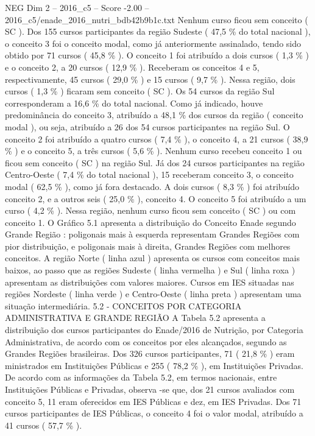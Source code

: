 \begin{textsample}{NEG Dim 2 – 2016\_c5 – Score -2.00 – 2016\_c5/enade\_2016\_nutri\_bdb42b9b1c.txt}
Nenhum curso ficou sem conceito ( SC ).
Dos 155 cursos participantes da região Sudeste ( 47,5 \% do total nacional ), o conceito 3 foi o conceito modal, como já anteriormente assinalado, tendo sido obtido por 71 cursos ( 45,8 \% ).
O conceito 1 foi atribuído a dois cursos ( 1,3 \% ) e o conceito 2, a 20 cursos ( 12,9 \% ).
Receberam os conceitos 4 e 5, respectivamente, 45 cursos ( 29,0 \% ) e 15 cursos ( 9,7 \% ).
Nessa região, dois cursos ( 1,3 \% ) ficaram sem conceito ( SC ).
Os 54 cursos da região Sul corresponderam a 16,6 \% do total nacional.
Como já indicado, houve predominância do conceito 3, atribuído a 48,1 \% dos cursos da região ( conceito modal ), ou seja, atribuído a 26 dos 54 cursos participantes na região Sul.
O conceito 2 foi atribuído a quatro cursos ( 7,4 \% ), o conceito 4, a 21 cursos ( 38,9 \% ) e o conceito 5, a três cursos ( 5,6 \% ).
Nenhum curso recebeu conceito 1 ou ficou sem conceito ( SC ) na região Sul.
Já dos 24 cursos participantes na região Centro-Oeste ( 7,4 \% do total nacional ), 15 receberam conceito 3, o conceito modal ( 62,5 \% ), como já fora destacado.
A dois cursos ( 8,3 \% ) foi atribuído conceito 2, e a outros seis ( 25,0 \% ), conceito 4.
O conceito 5 foi atribuído a um curso ( 4,2 \% ).
Nessa região, nenhum curso ficou sem conceito ( SC ) ou com conceito 1.
O Gráfico 5.1 apresenta a distribuição do Conceito Enade segundo Grande Região : poligonais mais à esquerda representam Grandes Regiões com pior distribuição, e poligonais mais à direita, Grandes Regiões com melhores conceitos.
A região Norte ( linha azul ) apresenta os cursos com conceitos mais baixos, ao passo que as regiões Sudeste ( linha vermelha ) e Sul ( linha roxa ) apresentam as distribuições com valores maiores.
Cursos em IES situadas nas regiões Nordeste ( linha verde ) e Centro-Oeste ( linha preta ) apresentam uma situação intermediária. 5.2 - CONCEITOS POR CATEGORIA ADMINISTRATIVA E GRANDE REGIÃO A Tabela 5.2 apresenta a distribuição dos cursos participantes do Enade/2016 de Nutrição, por Categoria Administrativa, de acordo com os conceitos por eles alcançados, segundo as Grandes Regiões brasileiras.
Dos 326 cursos participantes, 71 ( 21,8 \% ) eram ministrados em Instituições Públicas e 255 ( 78,2 \% ), em Instituições Privadas.
De acordo com as informações da Tabela 5.2, em termos nacionais, entre Instituições Públicas e Privadas, observa -se que, dos 21 cursos avaliados com conceito 5, 11 eram oferecidos em IES Públicas e dez, em IES Privadas.
Dos 71 cursos participantes de IES Públicas, o conceito 4 foi o valor modal, atribuído a 41 cursos ( 57,7 \% ).

\end{textsample}

